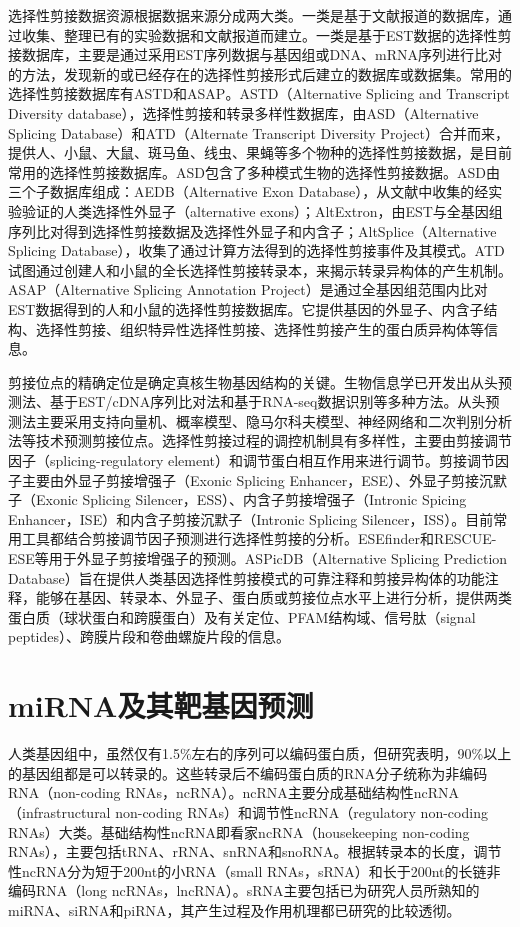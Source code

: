 选择性剪接数据资源根据数据来源分成两大类。一类是基于文献报道的数据库，通过收集、整理已有的实验数据和文献报道而建立。一类是基于EST数据的选择性剪接数据库，主要是通过采用EST序列数据与基因组或DNA、mRNA序列进行比对的方法，发现新的或已经存在的选择性剪接形式后建立的数据库或数据集。常用的选择性剪接数据库有ASTD和ASAP。ASTD（Alternative Splicing and Transcript Diversity database），选择性剪接和转录多样性数据库，由ASD（Alternative Splicing Database）和ATD（Alternate Transcript Diversity Project）合并而来，提供人、小鼠、大鼠、斑马鱼、线虫、果蝇等多个物种的选择性剪接数据，是目前常用的选择性剪接数据库。ASD包含了多种模式生物的选择性剪接数据。ASD由三个子数据库组成：AEDB（Alternative Exon Database），从文献中收集的经实验验证的人类选择性外显子（alternative exons）；AltExtron，由EST与全基因组序列比对得到选择性剪接数据及选择性外显子和内含子；AltSplice（Alternative Splicing Database），收集了通过计算方法得到的选择性剪接事件及其模式。ATD试图通过创建人和小鼠的全长选择性剪接转录本，来揭示转录异构体的产生机制。ASAP（Alternative Splicing Annotation Project）是通过全基因组范围内比对EST数据得到的人和小鼠的选择性剪接数据库。它提供基因的外显子、内含子结构、选择性剪接、组织特异性选择性剪接、选择性剪接产生的蛋白质异构体等信息。

剪接位点的精确定位是确定真核生物基因结构的关键。生物信息学已开发出从头预测法、基于EST/cDNA序列比对法和基于RNA-seq数据识别等多种方法。从头预测法主要采用支持向量机、概率模型、隐马尔科夫模型、神经网络和二次判别分析法等技术预测剪接位点。选择性剪接过程的调控机制具有多样性，主要由剪接调节因子（splicing-regulatory element）和调节蛋白相互作用来进行调节。剪接调节因子主要由外显子剪接增强子（Exonic Splicing Enhancer，ESE）、外显子剪接沉默子（Exonic Splicing Silencer，ESS）、内含子剪接增强子（Intronic Spicing Enhancer，ISE）和内含子剪接沉默子（Intronic Splicing Silencer，ISS）。目前常用工具都结合剪接调节因子预测进行选择性剪接的分析。ESEfinder和RESCUE-ESE等用于外显子剪接增强子的预测。ASPicDB（Alternative Splicing Prediction Database）旨在提供人类基因选择性剪接模式的可靠注释和剪接异构体的功能注释，能够在基因、转录本、外显子、蛋白质或剪接位点水平上进行分析，提供两类蛋白质（球状蛋白和跨膜蛋白）及有关定位、PFAM结构域、信号肽（signal peptides）、跨膜片段和卷曲螺旋片段的信息。

\section{miRNA及其靶基因预测} 
人类基因组中，虽然仅有1.5\%左右的序列可以编码蛋白质，但研究表明，90\%以上的基因组都是可以转录的。这些转录后不编码蛋白质的RNA分子统称为非编码RNA（non-coding RNAs，ncRNA）。ncRNA主要分成基础结构性ncRNA（infrastructural non-coding RNAs）和调节性ncRNA（regulatory non-coding RNAs）大类。基础结构性ncRNA即看家ncRNA（housekeeping non-coding RNAs），主要包括tRNA、rRNA、snRNA和snoRNA。根据转录本的长度，调节性ncRNA分为短于200nt的小RNA（small RNAs，sRNA）和长于200nt的长链非编码RNA（long ncRNAs，lncRNA）。sRNA主要包括已为研究人员所熟知的miRNA、siRNA和piRNA，其产生过程及作用机理都已研究的比较透彻。

